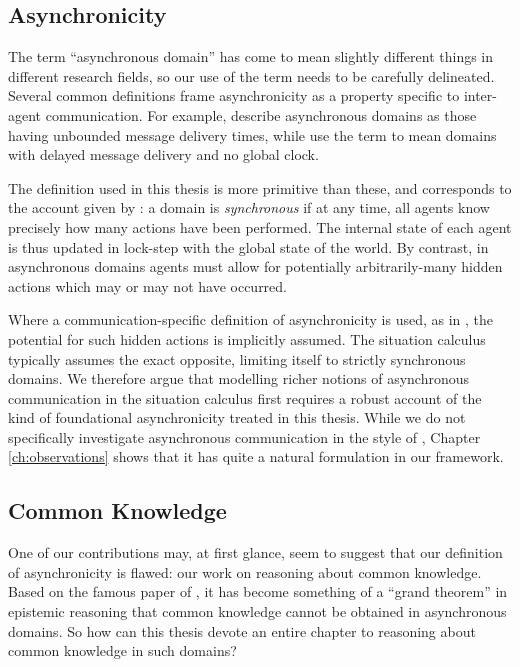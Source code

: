 \subsection{Asynchronicity}

The term {}``asynchronous domain'' has come to mean slightly different
things in different research fields, so our use of the term needs
to be carefully delineated. Several common definitions frame asynchronicity
as a property specific to inter-agent communication. For example,
\citet{fischer85distributed_consensus} describe asynchronous domains
as those having unbounded message delivery times, while \citet{halpern90knowledge_distrib}
use the term to mean domains with delayed message delivery and no
global clock.

The definition used in this thesis is more primitive than these, and
corresponds to the account given by \citet{vanBentham06tree_of_knowledge}:
a domain is \emph{synchronous} if at any time, all agents know precisely
how many actions have been performed. The internal state of each agent
is thus updated in lock-step with the global state of the world. By
contrast, in asynchronous domains agents must allow for potentially
arbitrarily-many hidden actions which may or may not have occurred.

Where a communication-specific definition of asynchronicity is used,
as in \citep{fischer85distributed_consensus,halpern90knowledge_distrib},
the potential for such hidden actions is implicitly assumed. The situation
calculus typically assumes the exact opposite, limiting itself to
strictly synchronous domains. We therefore argue that modelling richer
notions of asynchronous communication in the situation calculus first
requires a robust account of the kind of foundational asynchronicity
treated in this thesis. While we do not specifically investigate asynchronous
communication in the style of \citep{fischer85distributed_consensus,halpern90knowledge_distrib},
Chapter \ref{ch:observations} shows that it has quite a natural formulation
in our framework.


\subsection{Common Knowledge}

One of our contributions may, at first glance, seem to suggest that
our definition of asynchronicity is flawed: our work on reasoning
about common knowledge. Based on the famous paper of \citet{halpern90knowledge_distrib},
it has become something of a {}``grand theorem'' in epistemic reasoning
that common knowledge cannot be obtained in asynchronous domains.
So how can this thesis devote an entire chapter to reasoning about
common knowledge in such domains?

